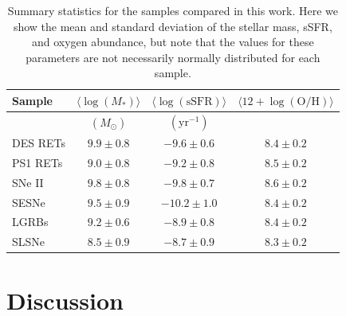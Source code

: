 \documentclass[fleqn,usenatbib,]{mnras}
\begin{document}
\begin{table}
    \centering
    \caption{Summary statistics for the samples compared in this work. Here we show the mean and standard deviation of the stellar mass, sSFR, and oxygen abundance, but note that the values for these parameters are not necessarily normally distributed for each sample. }
    \begin{tabular}{lccc}
    \toprule
   Sample & $\langle\log \left(M_*\right)\rangle$ &  $\langle\log \left(\mathrm{sSFR}\right)\rangle$ &$\langle12+\log\left(\mathrm{O/H}\right) \rangle$\\
   \midrule
   {} & $\left( M_{\odot}\right)$ & $\left(\mathrm{yr}^{-1} \right)$& \\
   \midrule
   DES RETs &$9.9 \pm 0.8$ & $-9.6 \pm 0.6 $ &$ 8.4 \pm 0.2$ \\
    PS1 RETs &$9.0 \pm 0.8$ & $-9.2 \pm 0.8 $ &$ 8.5 \pm 0.2$ \\
    SNe II &$9.8 \pm 0.8$ & $-9.8 \pm 0.7 $ &$ 8.6 \pm 0.2$ \\
    SESNe &$9.5 \pm 0.9$ & $-10.2 \pm 1.0 $ &$ 8.4 \pm 0.2$ \\
    LGRBs &$9.2 \pm 0.6$ & $-8.9 \pm 0.8 $ &$ 8.4 \pm 0.2$ \\
    SLSNe &$8.5 \pm 0.9$ & $-8.7 \pm 0.9 $ &$ 8.3 \pm 0.2$ \\
\bottomrule
    \end{tabular}
    
    \label{tab:summary}
\end{table}
\section{Discussion}
\end{document}
